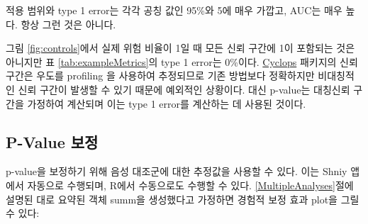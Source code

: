 \documentclass[11pt]{book}
\newenvironment{Shaded}{\begin{snugshade}}{\end{snugshade}}
\newcommand{\KeywordTok}[1]{\textcolor[rgb]{0.13,0.29,0.53}{\textbf{#1}}}
\newcommand{\DataTypeTok}[1]{\textcolor[rgb]{0.13,0.29,0.53}{#1}}
\newcommand{\StringTok}[1]{\textcolor[rgb]{0.31,0.60,0.02}{#1}}
\newcommand{\CommentTok}[1]{\textcolor[rgb]{0.56,0.35,0.01}{\textit{#1}}}
\newcommand{\OtherTok}[1]{\textcolor[rgb]{0.56,0.35,0.01}{#1}}
\newcommand{\OperatorTok}[1]{\textcolor[rgb]{0.81,0.36,0.00}{\textbf{#1}}}
\newcommand{\NormalTok}[1]{#1}
\theoremstyle{definition}
\theoremstyle{definition}
\theoremstyle{definition}
\theoremstyle{remark}
\begin{document}
적용 범위와 type 1 error는 각각 공칭 값인 95\%와 5에 매우 가깝고, AUC는
매우 높다. 항상 그런 것은 아니다.

그림 \ref{fig:controls}에서 실제 위험 비율이 1일 때 모든 신뢰 구간에 1이
포함되는 것은 아니지만 표 \ref{tab:exampleMetrics}의 type 1 error는
0\%이다. \href{https://ohdsi.github.io/Cyclops/}{Cyclops} 패키지의 신뢰
구간은 우도를 profiling 을 사용하여 추정되므로 기존 방법보다 정확하지만
비대칭적인 신뢰 구간이 발생할 수 있기 때문에 예외적인 상황이다. 대신
p-value는 대칭신뢰 구간을 가정하여 계산되며 이는 type 1 error를 계산하는
데 사용된 것이다.

\subsection{P-Value 보정}\label{p-value--1}

p-value을 보정하기 위해 음성 대조군에 대한 추정값을 사용할 수 있다. 이는
Shniy 앱에서 자동으로 수행되며, R에서 수동으로도 수행할 수 있다.
\ref{MultipleAnalyses}절에 설명된 대로 요약된 객체 summ을 생성했다고
가정하면 경험적 보정 효과 plot을 그릴 수 있다:

\begin{Shaded}
\end{Shaded}
\end{document}
